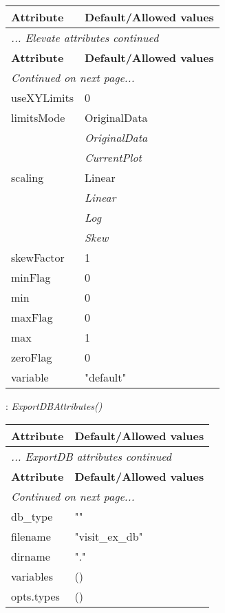 \documentclass[10pt,a4paper]{report}
\begin{document}
\begin{longtable}{ll}
{\bf Attribute} & {\bf Default/Allowed values} \\
\hline \hline
\endfirsthead
\multicolumn{2}{l}{{\it ... Elevate attributes continued}} \\
{\bf Attribute} & {\bf Default/Allowed values} \\
\hline \hline
\endhead
\hline
\multicolumn{2}{l}{{\it Continued on next page...}} \\
\endfoot
\hline
\endlastfoot

useXYLimits  &  0 \\
limitsMode  &  OriginalData   \\
 & {\it  OriginalData} \\
 & {\it  CurrentPlot} \\
scaling  &  Linear   \\
 & {\it  Linear} \\
 & {\it  Log} \\
 & {\it  Skew} \\
skewFactor  &  1 \\
minFlag  &  0 \\
min  &  0 \\
maxFlag  &  0 \\
max  &  1 \\
zeroFlag  &  0 \\
variable  &  "default" \\
\end{longtable}

\newpage

{}
: {\it ExportDBAttributes() }\\[-3mm]

\begin{longtable}{ll}
{\bf Attribute} & {\bf Default/Allowed values} \\
\hline \hline
\endfirsthead
\multicolumn{2}{l}{{\it ... ExportDB attributes continued}} \\
{\bf Attribute} & {\bf Default/Allowed values} \\
\hline \hline
\endhead
\hline
\multicolumn{2}{l}{{\it Continued on next page...}} \\
\endfoot
\hline
\endlastfoot

db\_type  &  "" \\
filename  &  "visit\_ex\_db" \\
dirname  &  "." \\
variables  &  () \\
opts.types  &  () \\
\end{longtable}
\end{document}
